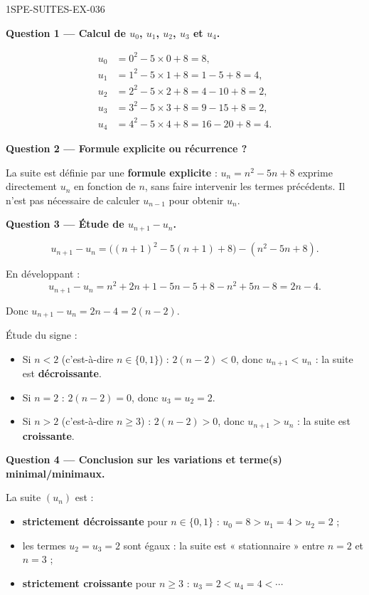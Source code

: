 \begin{corrige}{1SPE-SUITES-EX-036}

\textbf{Question 1 — Calcul de $u_0$, $u_1$, $u_2$, $u_3$ et $u_4$.}

\begin{align*}
  u_0 &= 0^2 - 5 \times 0 + 8 = 8, \\
  u_1 &= 1^2 - 5 \times 1 + 8 = 1 - 5 + 8 = 4, \\
  u_2 &= 2^2 - 5 \times 2 + 8 = 4 - 10 + 8 = 2, \\
  u_3 &= 3^2 - 5 \times 3 + 8 = 9 - 15 + 8 = 2, \\
  u_4 &= 4^2 - 5 \times 4 + 8 = 16 - 20 + 8 = 4.
\end{align*}

\medskip
\textbf{Question 2 — Formule explicite ou récurrence ?}

La suite est définie par une \textbf{formule explicite} : $u_n = n^2 - 5n + 8$ exprime directement $u_n$ en fonction de $n$, sans faire intervenir les termes précédents. Il n'est pas nécessaire de calculer $u_{n-1}$ pour obtenir $u_n$.

\medskip
\textbf{Question 3 — Étude de $u_{n+1} - u_n$.}

\[
  u_{n+1} - u_n = \bigl((n+1)^2 - 5(n+1) + 8\bigr) - (n^2 - 5n + 8).
\]

En développant :
\[
  u_{n+1} - u_n = n^2 + 2n + 1 - 5n - 5 + 8 - n^2 + 5n - 8 = 2n - 4.
\]


Donc $u_{n+1} - u_n = 2n - 4 = 2(n - 2)$.

Étude du signe :
\begin{itemize}
  \item Si $n < 2$ (c'est-à-dire $n \in \{0, 1\}$) : $2(n-2) < 0$, donc $u_{n+1} < u_n$ : la suite est \textbf{décroissante}.
  \item Si $n = 2$ : $2(n-2) = 0$, donc $u_3 = u_2 = 2$.
  \item Si $n > 2$ (c'est-à-dire $n \geq 3$) : $2(n-2) > 0$, donc $u_{n+1} > u_n$ : la suite est \textbf{croissante}.
\end{itemize}

\medskip
\textbf{Question 4 — Conclusion sur les variations et terme(s) minimal/minimaux.}


La suite $(u_n)$ est :
\begin{itemize}
  \item \textbf{strictement décroissante} pour $n \in \{0, 1\}$ : $u_0 = 8 > u_1 = 4 > u_2 = 2$ ;
  \item les termes $u_2 = u_3 = 2$ sont égaux : la suite est « stationnaire » entre $n = 2$ et $n = 3$ ;
  \item \textbf{strictement croissante} pour $n \geq 3$ : $u_3 = 2 < u_4 = 4 < \cdots$
\end{itemize}


\end{corrige}
